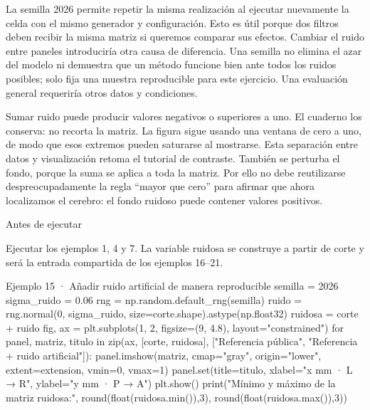 La semilla 2026 permite repetir la misma realización al ejecutar nuevamente la celda con el mismo generador y configuración. Esto es útil porque dos filtros deben recibir la misma matriz si queremos comparar sus efectos. Cambiar el ruido entre paneles introduciría otra causa de diferencia. Una semilla no elimina el azar del modelo ni demuestra que un método funcione bien ante todos los ruidos posibles; solo fija una muestra reproducible para este ejercicio. Una evaluación general requeriría otros datos y condiciones.


Sumar ruido puede producir valores negativos o superiores a uno. El cuaderno los conserva: no recorta la matriz. La figura sigue usando una ventana de cero a uno, de modo que esos extremos pueden saturarse al mostrarse. Esta separación entre datos y visualización retoma el tutorial de contraste. También se perturba el fondo, porque la suma se aplica a toda la matriz. Por ello no debe reutilizarse despreocupadamente la regla “mayor que cero” para afirmar que ahora localizamos el cerebro: el fondo ruidoso puede contener valores positivos.



\begin{Idea}{Antes de ejecutar}

Ejecutar los ejemplos 1, 4 y 7. La variable ruidosa se construye a partir de corte y será la entrada compartida de los ejemplos 16–21.


\end{Idea}

\begin{Codigo}{Ejemplo 15 · Añadir ruido artificial de manera reproducible}
semilla = 2026
sigma_ruido = 0.06
rng = np.random.default_rng(semilla)
ruido = rng.normal(0, sigma_ruido, size=corte.shape).astype(np.float32)
ruidosa = corte + ruido
fig, ax = plt.subplots(1, 2, figsize=(9, 4.8), layout="constrained")
for panel, matriz, titulo in zip(ax, [corte, ruidosa], ["Referencia pública", "Referencia + ruido artificial"]):
    panel.imshow(matriz, cmap="gray", origin="lower", extent=extension, vmin=0, vmax=1)
    panel.set(title=titulo, xlabel="x mm · L → R", ylabel="y mm · P → A")
plt.show()
print("Mínimo y máximo de la matriz ruidosa:", round(float(ruidosa.min()),3), round(float(ruidosa.max()),3))
\end{Codigo}


